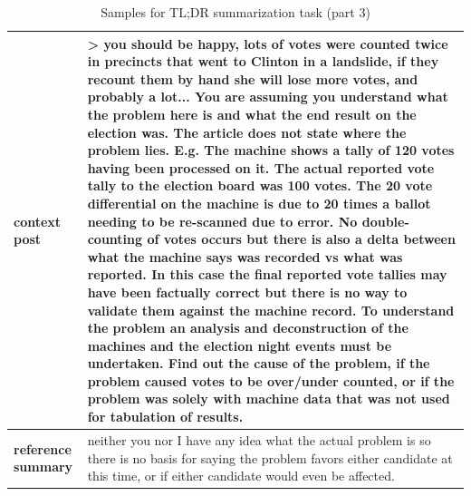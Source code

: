 \begin{table}[t]
\begin{center}
\caption*{Samples for TL;DR summarization task (part 3)}
\begin{tabular}{|p{2cm}|p{12cm}|}

\hline
    
\hline
\textbf{context post}
&
\multicolumn{1}{|C{12cm}|}{ 
> you should be happy, lots of votes were counted twice in precincts that went to Clinton in a landslide, if they recount them by hand she will lose more votes, and probably a lot...
\newline\newline
You are assuming you understand what the problem here is and what the end result on the election was.  The article does not state where the problem lies.
\newline\newline
E.g. The machine shows a tally of 120 votes having been processed on it.  The actual reported vote tally to the election board was 100 votes.  The 20 vote differential on the machine is due to 20 times a ballot needing to be re-scanned due to error.  No double-counting of votes occurs but there is also a delta between what the machine says was recorded vs what was reported.
\newline\newline
In this case the final reported vote tallies may have been factually correct but there is no way to validate them against the machine record.
\newline\newline
To understand the problem an analysis and deconstruction of the machines and the election night events must be undertaken.  Find out the cause of the problem, if the problem caused votes to be over/under counted, or if the problem was solely with machine data that was not used for tabulation of results.
}
\\
\hline

\textbf{reference summary}
&
neither you nor I have any idea what the actual problem is so there is no basis for saying the problem favors either candidate at this time, or if either candidate would even be affected.
\\
\hline
\hline


\end{tabular}
\end{center}
\end{table}
